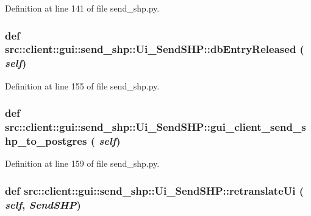 Definition at line 141 of file send\_\-shp.py.

\hypertarget{classsrc_1_1client_1_1gui_1_1send__shp_1_1Ui__SendSHP_a06e8aae7bd5c1d87a8a747d87e433187}{
\subsubsection[{dbEntryReleased}]{\setlength{\rightskip}{0pt plus 5cm}def src::client::gui::send\_\-shp::Ui\_\-SendSHP::dbEntryReleased ( {\em self})}}
\label{classsrc_1_1client_1_1gui_1_1send__shp_1_1Ui__SendSHP_a06e8aae7bd5c1d87a8a747d87e433187}


Definition at line 155 of file send\_\-shp.py.

\hypertarget{classsrc_1_1client_1_1gui_1_1send__shp_1_1Ui__SendSHP_a5bcad6d81d404ad4db08947c2711ad98}{
\subsubsection[{gui\_\-client\_\-send\_\-shp\_\-to\_\-postgres}]{\setlength{\rightskip}{0pt plus 5cm}def src::client::gui::send\_\-shp::Ui\_\-SendSHP::gui\_\-client\_\-send\_\-shp\_\-to\_\-postgres ( {\em self})}}
\label{classsrc_1_1client_1_1gui_1_1send__shp_1_1Ui__SendSHP_a5bcad6d81d404ad4db08947c2711ad98}


Definition at line 159 of file send\_\-shp.py.

\hypertarget{classsrc_1_1client_1_1gui_1_1send__shp_1_1Ui__SendSHP_ab194c03c7a18b72a16915dea92d16617}{
\subsubsection[{retranslateUi}]{\setlength{\rightskip}{0pt plus 5cm}def src::client::gui::send\_\-shp::Ui\_\-SendSHP::retranslateUi ( {\em self}, \/   {\em SendSHP})}}
\label{classsrc_1_1client_1_1gui_1_1send__shp_1_1Ui__SendSHP_ab194c03c7a18b72a16915dea92d16617}


